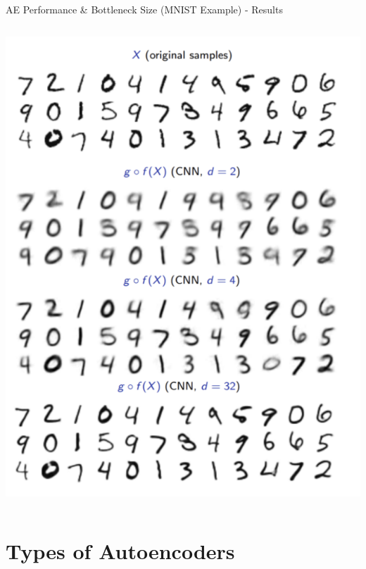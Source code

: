 \documentclass[serif, aspectratio=169]{beamer}
\begin{document}
\begin{frame}{AE Performance \& Bottleneck Size (MNIST Example) - Results}
\begin{columns}[t]
        \begin{column}{0.4\textwidth}%
            \vspace{-1.5cm}
            \begin{center}
                \includegraphics[width=\textwidth, height=\textheight, keepaspectratio]{pic/AE Performance & Bottleneck Size (MNIST Example).png} 
                    \vspace{2.5cm}
            \end{center}
        \end{column}
    \end{columns}
\end{frame}

\section{Types of Autoencoders}
\end{document}
